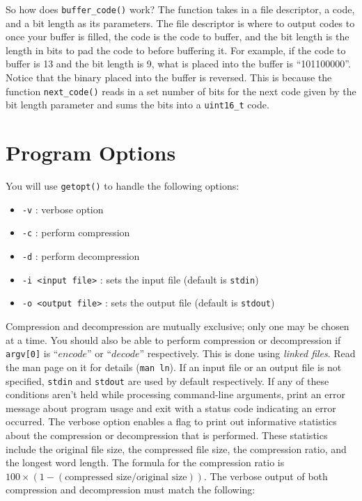 \documentclass{article}
\begin{document}
So how does \texttt{buffer\_code()} work? The function takes in a file
descriptor, a code, and a bit length as its parameters. The file descriptor is
where to output codes to once your buffer is filled, the code is the code to
buffer, and the bit length is the length in bits to pad the code to before
buffering it. For example, if the code to buffer is 13 and the bit length is 9,
what is placed into the buffer is ``101100000''. Notice that the binary placed
into the buffer is reversed. This is because the function \texttt{next\_code()}
reads in a set number of bits for the next code given by the bit length
parameter and sums the bits into a \texttt{uint16\_t} code.

\section{Program Options}
You will use \texttt{getopt()} to handle the following options:
\begin{itemize}
    \item \texttt{-v} : verbose option
    \item \texttt{-c} : perform compression
    \item \texttt{-d} : perform decompression
    \item \texttt{-i <input file>} : sets the input file (default is \texttt{stdin})
    \item \texttt{-o <output file>} : sets the output file (default is \texttt{stdout})
\end{itemize}
Compression and decompression are mutually exclusive; only one may be chosen at
a time. You should also be able to perform compression or decompression if
\texttt{argv[0]} is ``$encode$'' or ``$decode$'' respectively. This is done
using \emph{linked files}. Read the man page on it for details (\texttt{man
ln}). If an input file or an output file is not specified, \texttt{stdin} and
\texttt{stdout} are used by default respectively. If any of these conditions
aren't held while processing command-line arguments, print an error message
about program usage and exit with a status code indicating an error occurred.
The verbose option enables a flag to print out informative statistics about the
compression or decompression that is performed. These statistics include the
original file size, the compressed file size, the compression ratio, and the
longest word length. The formula for the compression ratio is
$100\times(1-(\text{compressed size} / \text{original size}))$. The verbose
output of both compression and decompression must match the following:
\end{document}
